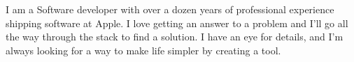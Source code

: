 

\begin{cvparagraph}

I am a Software developer with over a dozen years of professional experience shipping software at Apple. I love getting an answer to a problem and I'll go all the way through the stack to find a solution. I have an eye for details, and I'm always looking for a way to make life simpler by creating a tool.
\end{cvparagraph}
